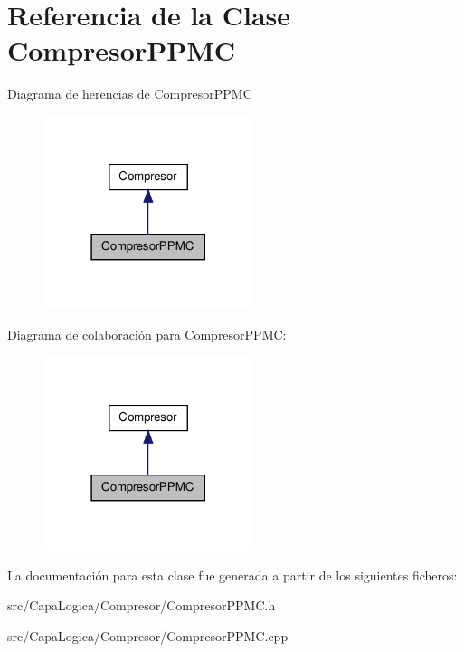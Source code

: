 \hypertarget{class_compresor_p_p_m_c}{\section{\-Referencia de la \-Clase \-Compresor\-P\-P\-M\-C}
\label{class_compresor_p_p_m_c}
}


\-Diagrama de herencias de \-Compresor\-P\-P\-M\-C
\nopagebreak
\begin{figure}[H]
\begin{center}
\leavevmode
\includegraphics[width=174pt]{class_compresor_p_p_m_c__inherit__graph}
\end{center}
\end{figure}


\-Diagrama de colaboración para \-Compresor\-P\-P\-M\-C\-:
\nopagebreak
\begin{figure}[H]
\begin{center}
\leavevmode
\includegraphics[width=174pt]{class_compresor_p_p_m_c__coll__graph}
\end{center}
\end{figure}


\-La documentación para esta clase fue generada a partir de los siguientes ficheros\-:\begin{DoxyCompactItemize}
\item 
src/\-Capa\-Logica/\-Compresor/\-Compresor\-P\-P\-M\-C.\-h\item 
src/\-Capa\-Logica/\-Compresor/\-Compresor\-P\-P\-M\-C.\-cpp\end{DoxyCompactItemize}
